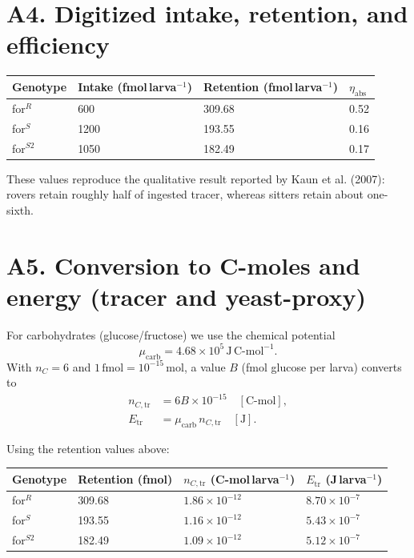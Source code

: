 \documentclass[11pt]{article}
\begin{document}
\section*{A4. Digitized intake, retention, and efficiency}
\begin{center}
\begin{tabular}{llll}
\toprule
Genotype & Intake (fmol\,larva$^{-1}$) & Retention (fmol\,larva$^{-1}$) & $\eta_{\mathrm{abs}}$ \\
\midrule
for$^R$    & 600  & 309.68 & 0.52 \\
for$^S$    & 1200 & 193.55 & 0.16 \\
for$^{S2}$ & 1050 & 182.49 & 0.17 \\
\bottomrule
\end{tabular}
\end{center}

These values reproduce the qualitative result reported by Kaun et al. (2007): rovers retain roughly half of ingested tracer, whereas sitters retain about one-sixth.

\section*{A5. Conversion to C-moles and energy (tracer and yeast-proxy)}
For carbohydrates (glucose/fructose) we use the chemical potential
\begin{equation}
  \mu_{\mathrm{carb}} = 4.68\times10^{5}\,\mathrm{J\,C\text{-}mol^{-1}}.
\end{equation}
With $n_C=6$ and $1\,\mathrm{fmol}=10^{-15}\,\mathrm{mol}$, a value $B$ (fmol glucose per larva) converts to
\begin{align}
  n_{C,\mathrm{tr}} &= 6B\times10^{-15}\quad [\mathrm{C\text{-}mol}],\\
  E_{\mathrm{tr}} &= \mu_{\mathrm{carb}}\,n_{C,\mathrm{tr}}\quad [\mathrm{J}].
\end{align}

Using the retention values above:
\begin{center}
\begin{tabular}{llll}
\toprule
Genotype & Retention (fmol) & $n_{C,\mathrm{tr}}$ (C-mol\,larva$^{-1}$) & $E_{\mathrm{tr}}$ (J\,larva$^{-1}$) \\
\midrule
for$^R$    & 309.68 & $1.86\times10^{-12}$ & $8.70\times10^{-7}$ \\
for$^S$    & 193.55 & $1.16\times10^{-12}$ & $5.43\times10^{-7}$ \\
for$^{S2}$ & 182.49 & $1.09\times10^{-12}$ & $5.12\times10^{-7}$ \\
\bottomrule
\end{tabular}
\end{center}
\end{document}
